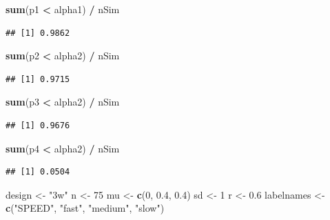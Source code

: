\documentclass[]{book}
\newenvironment{Shaded}{\begin{snugshade}}{\end{snugshade}}
\newcommand{\DecValTok}[1]{\textcolor[rgb]{0.00,0.00,0.81}{#1}}
\newcommand{\FloatTok}[1]{\textcolor[rgb]{0.00,0.00,0.81}{#1}}
\newcommand{\KeywordTok}[1]{\textcolor[rgb]{0.13,0.29,0.53}{\textbf{#1}}}
\newcommand{\NormalTok}[1]{#1}
\newcommand{\OperatorTok}[1]{\textcolor[rgb]{0.81,0.36,0.00}{\textbf{#1}}}
\newcommand{\StringTok}[1]{\textcolor[rgb]{0.31,0.60,0.02}{#1}}
\begin{document}
\begin{Shaded}
\begin{Highlighting}[]
\KeywordTok{sum}\NormalTok{(p1 }\OperatorTok{<}\StringTok{ }\NormalTok{alpha1) }\OperatorTok{/}\StringTok{ }\NormalTok{nSim}
\end{Highlighting}
\end{Shaded}

\begin{verbatim}
## [1] 0.9862
\end{verbatim}

\begin{Shaded}
\begin{Highlighting}[]
\KeywordTok{sum}\NormalTok{(p2 }\OperatorTok{<}\StringTok{ }\NormalTok{alpha2) }\OperatorTok{/}\StringTok{ }\NormalTok{nSim}
\end{Highlighting}
\end{Shaded}

\begin{verbatim}
## [1] 0.9715
\end{verbatim}

\begin{Shaded}
\begin{Highlighting}[]
\KeywordTok{sum}\NormalTok{(p3 }\OperatorTok{<}\StringTok{ }\NormalTok{alpha2) }\OperatorTok{/}\StringTok{ }\NormalTok{nSim}
\end{Highlighting}
\end{Shaded}

\begin{verbatim}
## [1] 0.9676
\end{verbatim}

\begin{Shaded}
\begin{Highlighting}[]
\KeywordTok{sum}\NormalTok{(p4 }\OperatorTok{<}\StringTok{ }\NormalTok{alpha2) }\OperatorTok{/}\StringTok{ }\NormalTok{nSim}
\end{Highlighting}
\end{Shaded}

\begin{verbatim}
## [1] 0.0504
\end{verbatim}

\begin{Shaded}
\begin{Highlighting}[]
\NormalTok{design <-}\StringTok{ "3w"}
\NormalTok{n <-}\StringTok{ }\DecValTok{75}
\NormalTok{mu <-}\StringTok{ }\KeywordTok{c}\NormalTok{(}\DecValTok{0}\NormalTok{, }\FloatTok{0.4}\NormalTok{, }\FloatTok{0.4}\NormalTok{)}
\NormalTok{sd <-}\StringTok{ }\DecValTok{1}
\NormalTok{r <-}\StringTok{ }\FloatTok{0.6}
\NormalTok{labelnames <-}\StringTok{ }\KeywordTok{c}\NormalTok{(}\StringTok{"SPEED"}\NormalTok{, }
                \StringTok{"fast"}\NormalTok{, }\StringTok{"medium"}\NormalTok{, }\StringTok{"slow"}\NormalTok{)}
\end{Highlighting}
\end{Shaded}
\end{document}
